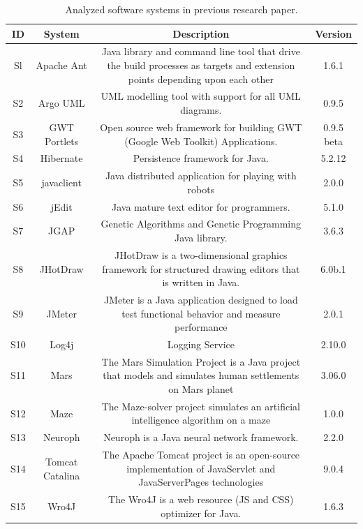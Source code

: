\documentclass[12pt, a4paper, twoside]{report}
\begin{document}
\begin{table}[H]
\renewcommand{\arraystretch}{1}
\caption{Analyzed software systems in previous research paper.}
\label{tab:keyclass:overview}
\centering
\begin{tabular}{|c|c|c|c|}
\hline
ID	&	System	&	Description	&	Version	\\
\hline
Sl	&	Apache Ant	&	Java library and command line tool that drive the build processes as targets and extension points depending upon each other	&	1.6.1	\\
S2	&	Argo UML	&	UML modelling tool with support for all UML diagrams.	&	0.9.5	\\
S3	&	GWT Portlets	&	Open source web framework for building GWT (Google Web Toolkit) Applications.	&	0.9.5 beta	\\
S4	&	Hibernate 	&	Persistence framework for Java.	&	5.2.12	\\
S5	&	javaclient	&	Java distributed application for playing with robots	&	2.0.0	\\
S6	&	jEdit	&	Java mature text editor for programmers.	&	5.1.0	\\
S7	&	JGAP	&	Genetic Algorithms and Genetic Programming Java library.	&	3.6.3	\\
S8	&	JHotDraw	&	JHotDraw is a two-dimensional graphics framework for structured drawing editors that is written in Java.	&	6.0b.1	\\
S9	&	JMeter	&	JMeter is a Java application designed to load test functional behavior and measure performance	&	2.0.1	\\
S10	&	Log4j	&	Logging Service	&	2.10.0	\\
S11	&	Mars	&	The Mars Simulation Project is a Java project that models and simulates human settlements on Mars planet	&	3.06.0	\\
S12	&	Maze	&	The Maze-solver project simulates an artificial intelligence algorithm on a maze	&	1.0.0	\\
S13	&	Neuroph	&	Neuroph is a Java neural network framework.	&	2.2.0	\\
S14	&	Tomcat Catalina	&	The Apache Tomcat project is an open-source implementation of JavaServlet and JavaServerPages technologies	&	9.0.4	\\
S15	&	Wro4J	&	The Wro4J is a web resource (JS and CSS) optimizer for Java.	&	1.6.3	\\
\hline
\end{tabular}
\end{table}
\end{document}
